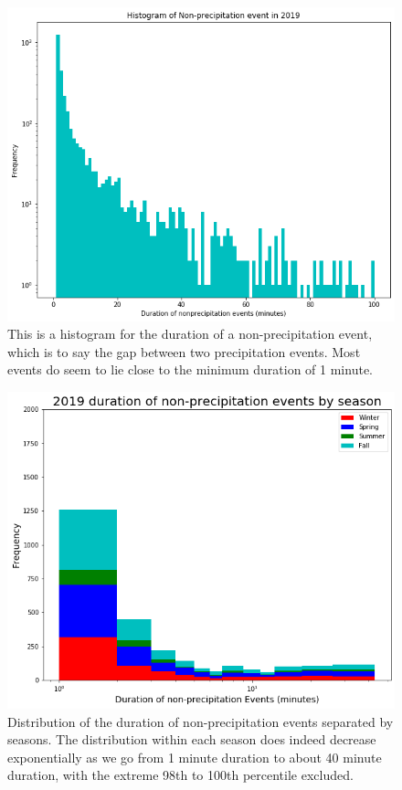 \begin{figure}[h]
	\centering
	\includegraphics[width=150mm]{../Figures/nonprecip_hist_1min.png}
	\caption{This is a histogram for the duration of a non-precipitation event, which is to say the gap between two precipitation events. Most events do seem to lie close to the minimum duration of 1 minute. }
\end{figure}
\begin{figure}[h]
	\centering
	\includegraphics[width=150mm]{../Figures/nonprecip1mm_season_19.png}
	\caption{Distribution of the duration of non-precipitation events separated by seasons. The distribution within each season does indeed decrease exponentially as we go from 1 minute duration to about 40 minute duration, with the extreme 98th to 100th percentile excluded.}
\end{figure}
